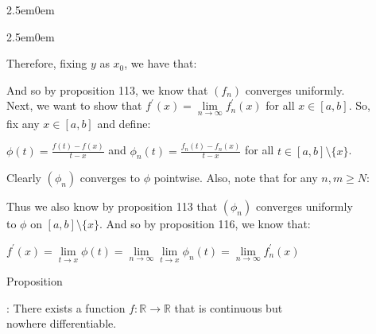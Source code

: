 \documentclass{book}
\newenvironment{myIndent}{%
   \begin{adjustwidth}{2.5em}{0em}%
}{%
   \end{adjustwidth}%
}
\newcounter{PropNumber}
\newcommand{\propCount}[1][1]{%
   \addtocounter{PropNumber}{#1}%
   \thePropNumber%
}
\newcommand{\retTwo}{\hfill\bigbreak}
\begin{document}
\begin{myIndent}
{\begin{myIndent}
      Therefore, fixing $y$ as $x_0$, we have that:

      {\retTwo\par}

      And so by proposition 113, we know that $(f_n)$ converges uniformly.\\ [5pt]

      Next, we want to show that $f^\prime(x) = \lim\limits_{n\rightarrow \infty}f^\prime_n(x)$ for all $x \in [a, b]$. So,\\ [-5pt] fix any $x \in [a,b]$ and define:
      
      {\center $\phi(t) = \frac{f(t) - f(x)}{t - x}$ and $\phi_n(t) = \frac{f_n(t) - f_n(x)}{t - x}$ for all $t \in [a,b]\setminus\{x\}$. \retTwo\par}

      Clearly $(\phi_n)$ converges to $\phi$ pointwise. Also, note that for any $n, m \geq N$:

      { \retTwo\par}

      Thus we also know by proposition 113 that $(\phi_n)$ converges uniformly\\ to $\phi$ on $[a, b] \setminus \{x\}$. And so by proposition 116, we know that:

      {\center $f^\prime(x) = \lim\limits_{t\rightarrow x}\phi(t) = \lim\limits_{n\rightarrow \infty}\lim\limits_{t\rightarrow x} \phi_n(t) = \lim\limits_{n\rightarrow \infty}f_n^\prime(x)$ \retTwo\par}
   \end{myIndent}}

   \newpage

   Proposition \propCount: There exists a function $f: \mathbb{R} \longrightarrow \mathbb{R}$ that is continuous but\\ nowhere differentiable.


\end{myIndent}
\end{document}
